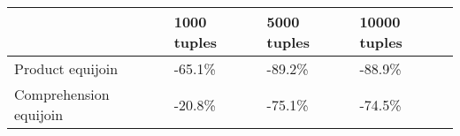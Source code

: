 \begin{tabular}{llll}
\toprule
 & 1000 tuples & 5000 tuples & 10000 tuples \\
\midrule
Product equijoin & -65.1\% & -89.2\% & -88.9\% \\
Comprehension equijoin & -20.8\% & -75.1\% & -74.5\% \\
\bottomrule
\end{tabular}
